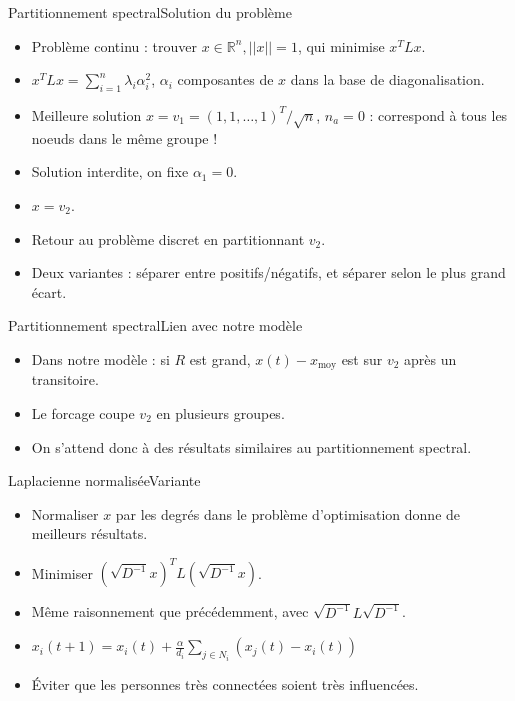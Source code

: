 \documentclass{beamer}
\begin{document}
\begin{frame}{Partitionnement spectral}{Solution du problème}
  \begin{itemize}
  \item Problème continu : trouver $x \in \mathbb{R}^n, ||x|| = 1$,
    qui minimise $x^T L x$.
  \item $x^T L x = \sum_{i=1}^n \lambda_i \alpha_i^2$, $\alpha_i$
    composantes de $x$ dans la base de diagonalisation.
  \item Meilleure solution $x = v_1 = (1, 1, \dots, 1)^T/\sqrt{n}$,
    $n_a = 0$ : correspond à tous les noeuds dans le même groupe !
  \item Solution interdite, on fixe $\alpha_1 = 0$.
  \item $x = v_2$.
  \item Retour au problème discret en partitionnant $v_2$.
  \item Deux variantes : séparer entre positifs/négatifs, et séparer
    selon le plus grand écart.
  \end{itemize}
\end{frame}

\begin{frame}{Partitionnement spectral}{Lien avec notre modèle}
  \begin{itemize}
  \item Dans notre modèle : si $R$ est grand, $x(t) - x_\text{moy}$ est
    sur $v_2$ après un transitoire.
  \item Le forcage coupe $v_2$ en plusieurs groupes.
  \item On s'attend donc à des résultats similaires au partitionnement spectral.
  \end{itemize}
\end{frame}

\begin{frame}{Laplacienne normalisée}{Variante}
  \begin{itemize}
  \item Normaliser $x$ par les degrés dans le problème d'optimisation
    donne de meilleurs résultats.
  \item Minimiser $(\sqrt{D^{-1}}x)^T L (\sqrt{D^{-1}}x)$.
  \item Même raisonnement que précédemment, avec $\sqrt{D^{-1}} L \sqrt{D^{-1}}$.
  \item $x_i(t+1) = x_i(t) + \frac{\alpha}{d_i} \sum_{j \in N_i} (x_j(t) - x_i(t))$
  \item Éviter que les personnes très connectées soient très influencées.
  \end{itemize}
\end{frame}
\end{document}

